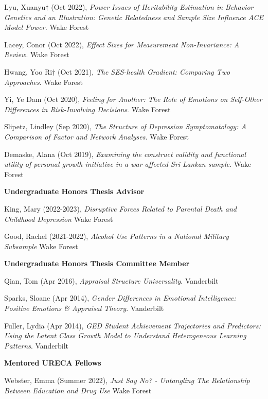 \begin{etaremune}%
\item  Lyu, Xuanyu$\dagger$ (Oct 2022), \textit{Power Issues of Heritability Estimation in Behavior Genetics and an Illustration: Genetic Relatedness and Sample Size Influence ACE Model Power.}  Wake Forest%
\item Lacey, Conor (Oct 2022), \textit{Effect Sizes for Measurement Non-Invariance: A Review}.  Wake Forest%
\item Hwang, Yoo Ri$\dagger$ (Oct 2021), \textit{The SES-health Gradient: Comparing Two Approaches}. Wake Forest%
\item Yi, Ye Dam (Oct 2020), \textit{Feeling for Another: The Role of Emotions on Self-Other Differences in Risk-Involving Decisions}. Wake Forest%
\item Slipetz, Lindley (Sep 2020), \textit{The Structure of Depression Symptomatology: A Comparison of Factor and Network Analyses}. Wake Forest%
\item Demaske, Alana (Oct 2019), \textit{Examining the construct validity and functional utility of personal growth initiative in a war-affected Sri Lankan sample}. Wake Forest%
\end{etaremune}%
%
{\large\textbf{Undergraduate Honors Thesis Advisor}}
\begin{etaremune}%
\item King, Mary (2022-2023), \textit{Disruptive Forces Related to Parental Death and Childhood Depression} Wake Forest%
\item Good, Rachel (2021-2022), \textit{Alcohol Use Patterns in a National Military Subsample} Wake Forest%
\end{etaremune}%


{\large\textbf{Undergraduate Honors Thesis Committee Member}}
\begin{etaremune}
\item Qian, Tom (Apr 2016), \textit{Appraisal Structure Universality}. Vanderbilt%
%
\item Sparks, Sloane (Apr 2014), \textit{Gender Differences in Emotional Intelligence: Positive Emotions \& Appraisal Theory}. Vanderbilt%
\item Fuller, Lydia (Apr 2014), \textit{GED Student Achievement Trajectories and Predictors: Using the Latent Class Growth Model to Understand Heterogeneous Learning Patterns}. Vanderbilt%
\end{etaremune}


{\large\textbf{Mentored URECA Fellows}}
\begin{etaremune}%
\item Webster, Emma (Summer 2022), \textit{Just Say No? - Untangling The Relationship Between Education and Drug Use} Wake Forest%
\end{etaremune}%
